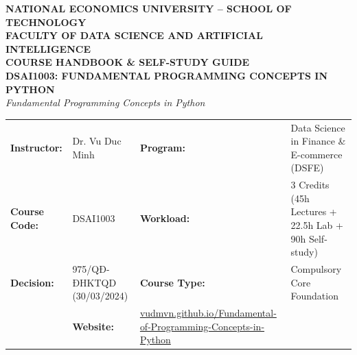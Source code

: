 \documentclass[11pt,a4paper]{article}
\begin{document}
\begin{tcolorbox}[
    enhanced,
    colback=primaryblue,
    colframe=primaryblue,
    arc=5pt,
    boxrule=0pt,
    top=6mm, bottom=6mm, left=6mm, right=6mm
]
\begin{center}
    {\color{white}\large\textbf{NATIONAL ECONOMICS UNIVERSITY -- SCHOOL OF TECHNOLOGY}}\\[1mm]
    {\color{white}\small\textbf{FACULTY OF DATA SCIENCE AND ARTIFICIAL INTELLIGENCE}}\\[4mm]
    {\color{white}\Huge\textbf{COURSE HANDBOOK \& SELF-STUDY GUIDE}}\\[2mm]
    {\color{accentgold}\Large\textbf{DSAI1003: FUNDAMENTAL PROGRAMMING CONCEPTS IN PYTHON}}\\[1mm]
    {\color{white!80}\small\textit{Fundamental Programming Concepts in Python}}
\end{center}
\end{tcolorbox}

\vspace{2mm}

\begin{tcolorbox}[
    enhanced,
    colback=white,
    colframe=borderblue,
    arc=4pt,
    boxrule=1pt,
    top=3mm, bottom=3mm, left=4mm, right=4mm
]
\begin{tabularx}{\textwidth}{@{}lXlX@{}}
    \textbf{Instructor:} & Dr. Vu Duc Minh & \textbf{Program:} & Data Science in Finance \& E-commerce (DSFE) \\
    \textbf{Course Code:} & DSAI1003 & \textbf{Workload:} & 3 Credits (45h Lectures + 22.5h Lab + 90h Self-study) \\
    \textbf{Decision:} & 975/QĐ-ĐHKTQD (30/03/2024) & \textbf{Course Type:} & Compulsory Core Foundation \\
    & \textbf{Website:} & \href{https://vudmvn.github.io/Fundamental-of-Programming-Concepts-in-Python/}{vudmvn.github.io/Fundamental-of-Programming-Concepts-in-Python} \\
\end{tabularx}
\end{tcolorbox}

\vspace{3mm}

\tableofcontents

\vspace{5mm}

\end{document}

